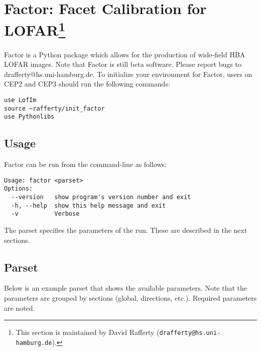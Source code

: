 \documentclass[structabstract]{article}
\begin{document}

\section[Factor: Facet Calibration for LOFAR]{Factor: Facet Calibration for
LOFAR\footnote{This section is maintained by David Rafferty
({\tt drafferty@hs.uni-hamburg.de}).}}
\label{factor}

Factor is a Python package which allows for the production of wide-field HBA
LOFAR images. Note that Factor is still beta software. Please report bugs to
drafferty@hs.uni-hamburg.de. To initialize your environment for Factor, users on
CEP2 and CEP3 should run the following commands:
\begin{verbatim}
use LofIm
source ~rafferty/init_factor
use Pythonlibs
\end{verbatim}

\subsection{Usage}
\label{factor:usage}

Factor can be run from the command-line as follows:
\begin{verbatim}
Usage: factor <parset>
Options:
  --version   show program's version number and exit
  -h, --help  show this help message and exit
  -v          Verbose
\end{verbatim}
The parset specifies the parameters of the run. These are described in the next
sections.

\subsection{Parset}
\label{factor:parset}

Below is an example parset that shows the available parameters. Note that the
parameters are grouped by sections (global, directions, etc.). Required
parameters are noted.
\end{document}
